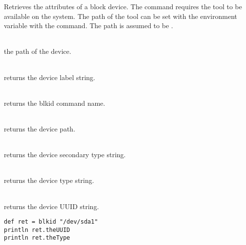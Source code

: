 %


Retrieves the attributes of a block device.
The command requires the tool \cite{blkid14} to be 
available on the system. The path of the tool can be set with the
environment variable  with the 
command. The path is assumed to be .

\begin{asparadesc}
%
\item[\code{path}]  \hfill \\
the path of the device.
%
\item[\code{theLabel}]  \hfill \\
returns the device label string.
%
\item[\code{theName}]  \hfill \\
returns the blkid command name.
%
\item[\code{thePath}]  \hfill \\
returns the device path.
%
\item[\code{theSecondaryType}]  \hfill \\
returns the device secondary type string.
%
\item[\code{theType}]  \hfill \\
returns the device type string.
%
\item[\code{theUUID}]  \hfill \\
returns the device UUID string.
%
\end{asparadesc}

\begin{lstlisting}[style=Groovybash, label={lst:example_blkid1}, title={
Show device attributes.}]
def ret = blkid "/dev/sda1"
println ret.theUUID
println ret.theType
\end{lstlisting}

